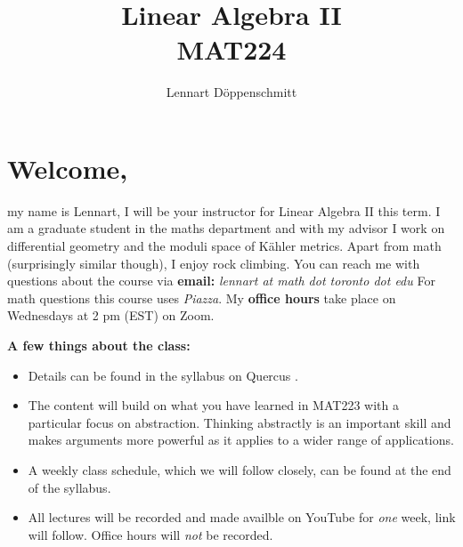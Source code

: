 \documentclass[letterpaper, 10pt]{article}
\begin{document}

\title{Linear Algebra II \\ \Large{MAT224}}
\author{Lennart Döppenschmitt}
\maketitle


\section*{Welcome,}%
my name is Lennart, I will be your instructor for Linear Algebra II this term.
I am a graduate student in the maths department and with my advisor I work on differential
geometry and the moduli space of Kähler metrics.
Apart from math (surprisingly similar though), I enjoy rock climbing.
\lb
You can reach me with questions about the course via \textbf{email: }
\emph{lennart at math dot toronto dot edu}
\pr
For math questions this course uses \emph{Piazza}.
\lb
My \textbf{office hours} take place on Wednesdays at 2 pm (EST) on Zoom.

\lb
\lb
\textbf{A few things about the class:}
\begin{itemize}
    \item
        Details can be found in the syllabus on Quercus
        \href{https://q.utoronto.ca}
        {}.


    \item The content will build on what you have learned in MAT223 with a
        particular focus on abstraction. Thinking abstractly is an important skill and
        makes arguments more powerful as it applies to a wider range of applications.

    \item
        A weekly class schedule, which we will follow closely, can be found at
        the end of the syllabus.

    \item
        All lectures will be recorded and made availble on YouTube for
        \emph{one} week, link will follow.
        Office hours will \emph{not} be recorded.
\end{itemize}
\end{document}
